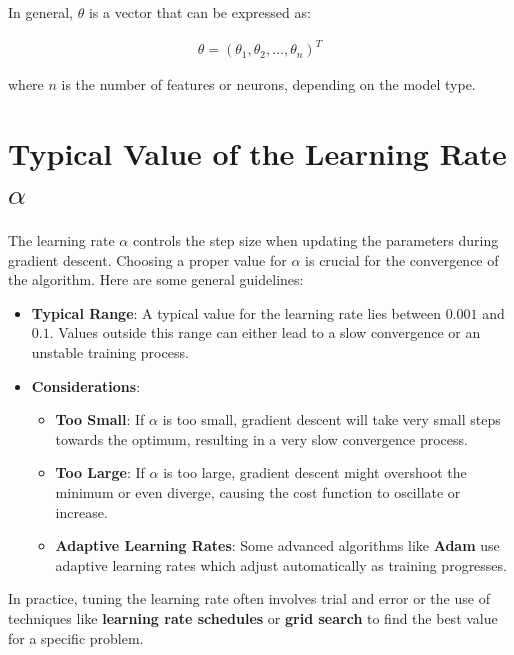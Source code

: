 \documentclass[
  12 pt,
  a4paper,
]{book}
\providecommand{\tightlist}{%
  \setlength{\itemsep}{0pt}\setlength{\parskip}{0pt}}
\numberwithin{equation}{section}
\theoremstyle{plain}      %
\theoremstyle{definition} %
\theoremstyle{remark}     %
\theoremstyle{note}         %
\begin{document}
In general, \(\theta\) is a vector that can be expressed as:

\begin{align}
\theta = (\theta_1, \theta_2, \dots, \theta_n)^T
\end{align}

where \(n\) is the number of features or neurons, depending on the model
type.

\hypertarget{typical-value-of-the-learning-rate-alpha}{%
\section{\texorpdfstring{Typical Value of the Learning Rate
\(\alpha\)}{Typical Value of the Learning Rate \textbackslash alpha}}\label{typical-value-of-the-learning-rate-alpha}}

The learning rate \(\alpha\) controls the step size when updating the
parameters during gradient descent. Choosing a proper value for
\(\alpha\) is crucial for the convergence of the algorithm. Here are
some general guidelines:

\begin{itemize}
\item
  \textbf{Typical Range}: A typical value for the learning rate lies
  between \(0.001\) and \(0.1\). Values outside this range can either
  lead to a slow convergence or an unstable training process.
\item
  \textbf{Considerations}:

  \begin{itemize}
  \tightlist
  \item
    \textbf{Too Small}: If \(\alpha\) is too small, gradient descent
    will take very small steps towards the optimum, resulting in a very
    slow convergence process.
  \item
    \textbf{Too Large}: If \(\alpha\) is too large, gradient descent
    might overshoot the minimum or even diverge, causing the cost
    function to oscillate or increase.
  \item
    \textbf{Adaptive Learning Rates}: Some advanced algorithms like
    \textbf{Adam} use adaptive learning rates which adjust automatically
    as training progresses.
  \end{itemize}
\end{itemize}

In practice, tuning the learning rate often involves trial and error or
the use of techniques like \textbf{learning rate schedules} or
\textbf{grid search} to find the best value for a specific problem.
\end{document}
